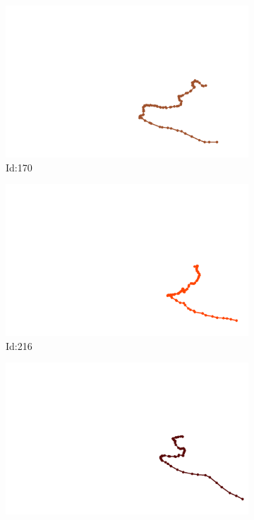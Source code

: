 \documentclass[12pt,twoside]{report}
\begin{document}
\begin{figure}
\centering
\begin{subfigure}[b]{0.20\textwidth}
\centering
\includegraphics[width=\textwidth]{../../trajectories/170.png}
\caption{Id:170}
\end{subfigure}
\begin{subfigure}[b]{0.20\textwidth}
\centering
\includegraphics[width=\textwidth]{../../trajectories/216.png}
\caption{Id:216}
\end{subfigure}
\begin{subfigure}[b]{0.20\textwidth}
\centering
\includegraphics[width=\textwidth]{../../trajectories/264.png}

\end{subfigure}
\end{figure}
\end{document}
